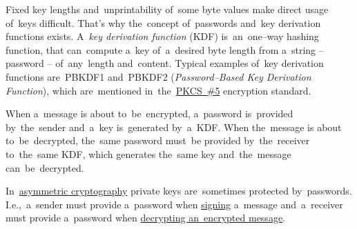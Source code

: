 \label{keypassword}
Fixed key lengths and~unprintability of~some byte values make direct usage of~keys difficult.
That's why the~concept of~passwords and~key derivation functions exists.
A~\textit{key derivation function} (KDF) is~an~one--way hashing function, that can~compute a~key of~a~desired byte length from a~string -- password -- of~any~length and~content.
Typical examples of~key derivation functions are~PBKDF1 and~PBKDF2 (\textit{Password--Based Key Derivation Function}), which are~mentioned in~the~\hyperref[pkcs]{PKCS~\#5} encryption standard.

When a~message is about to~be~encrypted, a~password is~provided by~the~sender and~a~key is~generated by~a~KDF\@.
When the~message is about to~be~decrypted, the~same password must~be provided by~the~receiver to~the~same KDF, which generates the~same key and~the~message can~be~decrypted.

In~\hyperref[asymmetriccryptography]{asymmetric cryptography} private keys are~sometimes protected by~passwords.
I.e.,~a~sender must provide a~password when \hyperref[electronicsignature]{signing} a~message and~a~receiver must provide a~password when \hyperref[asymmetriccryptography]{decrypting an~encrypted message}.
